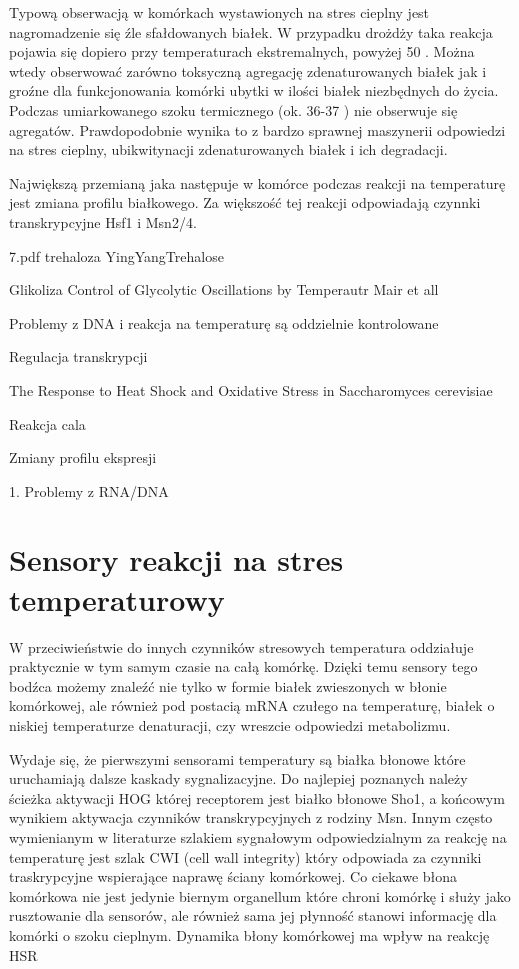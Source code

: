 \documentclass{pracamgr}
\begin{document}
 Typową obserwacją w komórkach wystawionych na stres cieplny jest nagromadzenie się źle sfałdowanych białek. 
 W przypadku drożdży taka reakcja pojawia się dopiero przy temperaturach ekstremalnych, powyżej 50 \textcelsius. Można
 wtedy obserwować zarówno toksyczną agregację zdenaturowanych białek jak i groźne dla funkcjonowania komórki ubytki w 
 ilości białek niezbędnych do życia. Podczas umiarkowanego szoku termicznego (ok. 36-37 \textcelsius) nie obserwuje się
 agregatów. Prawdopodobnie wynika to z bardzo sprawnej maszynerii odpowiedzi na stres cieplny, ubikwitynacji zdenaturowanych
 białek i ich degradacji\cite{Bible}.
 

 Największą przemianą jaka następuje w komórce podczas reakcji na temperaturę jest zmiana profilu białkowego. Za większość tej 
 reakcji odpowiadają czynnki transkrypcyjne Hsf1 i Msn2/4. 
 
 7.pdf
 trehaloza YingYangTrehalose
 
 Glikoliza Control of Glycolytic Oscillations by Temperautr Mair et all
 
Problemy z DNA i reakcja na temperaturę są oddzielnie kontrolowane \cite{Duallyregulated85}

Regulacja transkrypcji \cite{Yamamoto08}

The Response to Heat Shock and Oxidative Stress
in Saccharomyces cerevisiae \cite{Morano12}

Reakcja cala \cite{Bible}
 

Zmiany profilu ekspresji \cite{Gash00}

1. Problemy z RNA/DNA


\section{Sensory reakcji na stres temperaturowy}

W przeciwieństwie do innych czynników stresowych temperatura oddziałuje praktycznie w tym samym czasie na całą komórkę. 
Dzięki temu sensory tego bodźca możemy znaleźć nie tylko w formie białek zwieszonych w błonie komórkowej, ale również 
pod postacią mRNA czułego na temperaturę, białek o niskiej temperaturze denaturacji, czy wreszcie odpowiedzi metabolizmu.

Wydaje się, że pierwszymi sensorami temperatury są białka błonowe które uruchamiają dalsze kaskady sygnalizacyjne. Do 
najlepiej poznanych należy ścieżka aktywacji HOG której receptorem jest białko błonowe Sho1, a końcowym wynikiem 
aktywacja czynników transkrypcyjnych z rodziny Msn\cite{SensingLesson}. Innym często wymienianym w literaturze szlakiem sygnałowym odpowiedzialnym 
za reakcję na temperaturę jest szlak CWI (cell wall integrity) który odpowiada za czynniki traskrypcyjne wspierające 
naprawę ściany komórkowej. \cite{CWI} %
 Co ciekawe błona komórkowa nie jest jedynie biernym organellum które chroni
 komórkę i służy jako rusztowanie dla sensorów, ale również sama jej płynność stanowi informację dla komórki o szoku cieplnym.
 Dynamika błony komórkowej ma wpływ na reakcję HSR\cite{Carratu96}
\end{document}
